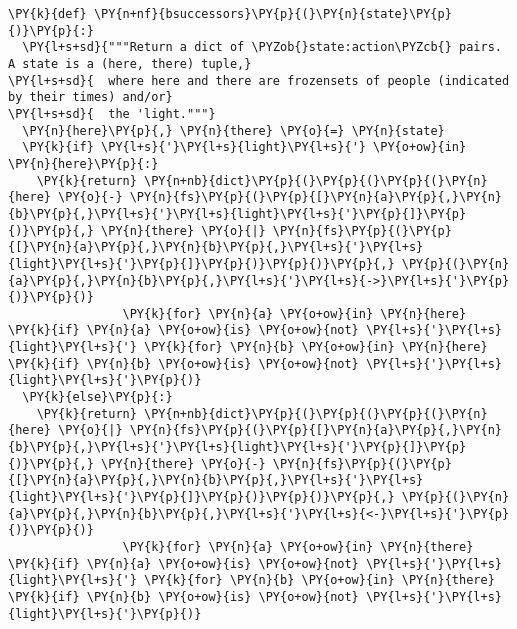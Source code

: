 \begin{Verbatim}[commandchars=\\\{\}]
\PY{k}{def} \PY{n+nf}{bsuccessors}\PY{p}{(}\PY{n}{state}\PY{p}{)}\PY{p}{:}
  \PY{l+s+sd}{"""Return a dict of \PYZob{}state:action\PYZcb{} pairs. A state is a (here, there) tuple,}
\PY{l+s+sd}{  where here and there are frozensets of people (indicated by their times) and/or}
\PY{l+s+sd}{  the 'light."""}
  \PY{n}{here}\PY{p}{,} \PY{n}{there} \PY{o}{=} \PY{n}{state}
  \PY{k}{if} \PY{l+s}{'}\PY{l+s}{light}\PY{l+s}{'} \PY{o+ow}{in} \PY{n}{here}\PY{p}{:}
    \PY{k}{return} \PY{n+nb}{dict}\PY{p}{(}\PY{p}{(}\PY{p}{(}\PY{n}{here} \PY{o}{-} \PY{n}{fs}\PY{p}{(}\PY{p}{[}\PY{n}{a}\PY{p}{,}\PY{n}{b}\PY{p}{,}\PY{l+s}{'}\PY{l+s}{light}\PY{l+s}{'}\PY{p}{]}\PY{p}{)}\PY{p}{,} \PY{n}{there} \PY{o}{|} \PY{n}{fs}\PY{p}{(}\PY{p}{[}\PY{n}{a}\PY{p}{,}\PY{n}{b}\PY{p}{,}\PY{l+s}{'}\PY{l+s}{light}\PY{l+s}{'}\PY{p}{]}\PY{p}{)}\PY{p}{)}\PY{p}{,} \PY{p}{(}\PY{n}{a}\PY{p}{,}\PY{n}{b}\PY{p}{,}\PY{l+s}{'}\PY{l+s}{->}\PY{l+s}{'}\PY{p}{)}\PY{p}{)}
                \PY{k}{for} \PY{n}{a} \PY{o+ow}{in} \PY{n}{here} \PY{k}{if} \PY{n}{a} \PY{o+ow}{is} \PY{o+ow}{not} \PY{l+s}{'}\PY{l+s}{light}\PY{l+s}{'} \PY{k}{for} \PY{n}{b} \PY{o+ow}{in} \PY{n}{here} \PY{k}{if} \PY{n}{b} \PY{o+ow}{is} \PY{o+ow}{not} \PY{l+s}{'}\PY{l+s}{light}\PY{l+s}{'}\PY{p}{)}
  \PY{k}{else}\PY{p}{:}
    \PY{k}{return} \PY{n+nb}{dict}\PY{p}{(}\PY{p}{(}\PY{p}{(}\PY{n}{here} \PY{o}{|} \PY{n}{fs}\PY{p}{(}\PY{p}{[}\PY{n}{a}\PY{p}{,}\PY{n}{b}\PY{p}{,}\PY{l+s}{'}\PY{l+s}{light}\PY{l+s}{'}\PY{p}{]}\PY{p}{)}\PY{p}{,} \PY{n}{there} \PY{o}{-} \PY{n}{fs}\PY{p}{(}\PY{p}{[}\PY{n}{a}\PY{p}{,}\PY{n}{b}\PY{p}{,}\PY{l+s}{'}\PY{l+s}{light}\PY{l+s}{'}\PY{p}{]}\PY{p}{)}\PY{p}{)}\PY{p}{,} \PY{p}{(}\PY{n}{a}\PY{p}{,}\PY{n}{b}\PY{p}{,}\PY{l+s}{'}\PY{l+s}{<-}\PY{l+s}{'}\PY{p}{)}\PY{p}{)}
                \PY{k}{for} \PY{n}{a} \PY{o+ow}{in} \PY{n}{there} \PY{k}{if} \PY{n}{a} \PY{o+ow}{is} \PY{o+ow}{not} \PY{l+s}{'}\PY{l+s}{light}\PY{l+s}{'} \PY{k}{for} \PY{n}{b} \PY{o+ow}{in} \PY{n}{there} \PY{k}{if} \PY{n}{b} \PY{o+ow}{is} \PY{o+ow}{not} \PY{l+s}{'}\PY{l+s}{light}\PY{l+s}{'}\PY{p}{)}


\end{Verbatim}
